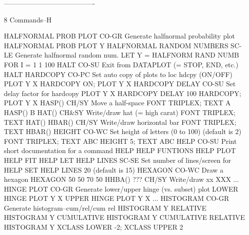 ----------------------------------------
 
8
Commands--H
 
HALFNORMAL PROB PLOT        CO-GR Generate halfnormal probability plot
                                  HALFNORMAL PROB PLOT Y
HALFNORMAL RANDOM NUMBERS   SC-LE Generate halfnormal random num.
                                  LET Y = HALFNORM RAND NUMB FOR I = 1 1 100
HALT                        CO-SU Exit from DATAPLOT (= STOP, END, etc.)
                                  HALT
HARDCOPY                    CO-PC Set auto copy of plots to loc hdcpy (ON/OFF)
                                  PLOT Y X
                                  HARDCOPY ON; PLOT Y X
HARDCOPY DELAY              CO-SU Set delay factor for hardcopy
                                  PLOT Y X
                                  HARDCOPY DELAY 100
                                  HARDCOPY; PLOT Y X
HASP()                      CH/SY Move a half-space
                                  FONT TRIPLEX; TEXT A HASP() B
HAT()                       CH&SY Write/draw hat (= high carat)
                                  FONT TRIPLEX; TEXT HAT()
HBAR()                      CH/SY Write/draw horizontal bar
                                  FONT TRIPLEX; TEXT HBAR()
HEIGHT                      CO-WC Set height of letters (0 to 100)
                                  (default is 2)
                                  FONT TRIPLEX; TEXT ABC
                                  HEIGHT 5; TEXT ABC
HELP                        CO-SU Print short documentation for a command
                                  HELP
                                  HELP FUNTIONS
                                  HELP PLOT
                                  HELP FIT
                                  HELP LET
HELP LINES                  SC-SE Set number of lines/screen for HELP
                                  SET HELP LINES 20 (default is 15)
HEXAGON                     CO-WC Draw a hexagon
                                  HEXAGON 50 50 70 50
HHBA()  ???                 CH/SY Write/draw xx
                                  XXX
... HINGE PLOT              CO-GR Generate lower/upper hinge (vs. subset) plot
                                  LOWER HINGE PLOT Y X
                                  UPPER HINGE PLOT Y X
... HISTOGRAM               CO-GR Generate histogram--cum/rel/cum rel
                                  HISTOGRAM Y
                                  RELATIVE HISTOGRAM Y
                                  CUMULATIVE HISTOGRAM Y
                                  CUMULATIVE RELATIVE HISTOGRAM Y
                                  XCLASS LOWER -2; XCLASS UPPER 2
